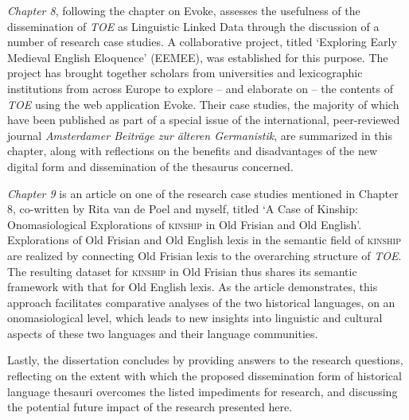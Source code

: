 \textit{Chapter 8}, following the chapter on Evoke, assesses the usefulness of the dissemination of \textit{TOE} as Linguistic Linked Data through the discussion of a number of research case studies. A collaborative project, titled `Exploring Early Medieval English Eloquence' (EEMEE), was established for this purpose. The project has brought together scholars from universities and lexicographic institutions from across Europe to explore -- and elaborate on -- the contents of \textit{TOE} using the web application Evoke. 
Their case studies, the majority of which have been published as part of a special issue of the international, peer-reviewed journal \textit{Amsterdamer Beiträge zur älteren Germanistik}, are summarized in this chapter, along with reflections on the benefits and disadvantages of the new digital form and dissemination of the thesaurus concerned.

\textit{Chapter 9} is an article on one of the research case studies mentioned in Chapter 8, 
co-written by Rita van de Poel and myself, %
titled `A Case of Kinship: Onomasiological Explorations of \textsc{kinship} in Old Frisian and Old English'. Explorations of Old Frisian and Old English lexis in the semantic field of \textsc{kinship} are realized by connecting Old Frisian lexis to the overarching structure of \textit{TOE}. The resulting dataset for \textsc{kinship} in Old Frisian thus shares its semantic framework with that for Old English lexis. As the article demonstrates, this approach facilitates comparative analyses of the two historical languages, on an onomasiological level, which leads to new insights into linguistic and cultural aspects of these two languages and their language communities.

\vspace{\baselineskip}
\noindent
Lastly, the dissertation concludes by providing answers to the research questions, reflecting on the extent with which the proposed dissemination form of historical language thesauri overcomes the listed impediments for research, and discussing the potential future impact of the research presented here. %


